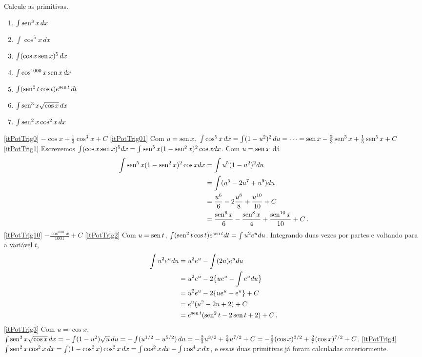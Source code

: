 \begin{exo} Calcule as primitivas.
\begin{multicols}{3}
\begin{enumerate}
\item\label{itPotTrig0} $\int \operatorname{sen}^3x\,dx$
\item\label{itPotTrig01} $\int \cos^5x\,dx$
\item\label{itPotTrig1} $\int (\cos x\operatorname{sen} x)^5\,dx$
\item\label{itPotTrig10} $\int \cos^{1000} x\operatorname{sen} x\,dx$
\item\label{itPotTrig2} $\int (\operatorname{sen}^2t\cos t) e^{\operatorname{sen} t}\,dt$
\item\label{itPotTrig3} $\int \operatorname{sen}^3x \sqrt{\cos x}\,dx$
\item\label{itPotTrig4} $\int \operatorname{sen}^2x\cos^2x\,dx$
\end{enumerate}
\end{multicols}
\vspace{0.01cm}
\begin{sol}
\eqref{itPotTrig0} $-\cos x+\tfrac13\cos^3x+C$
\eqref{itPotTrig01} Com $u=\operatorname{sen} x$, $\int \cos^5x\,dx=\int
(1-u^2)^2\,du=\cdots=\operatorname{sen} x-\tfrac23\operatorname{sen}^3x+\tfrac15\operatorname{sen}^5x+C$
\eqref{itPotTrig1} Escrevemos
$\int (\cos x\operatorname{sen} x)^5dx=\int
\operatorname{sen}^5x(1-\operatorname{sen}^2x)^2\cos xdx$. 
Com $u=\operatorname{sen} x$ dá 
\begin{align*}
 \int \operatorname{sen}^5x(1-\operatorname{sen}^2x)^2\cos xdx&=
\int u^5(1-u^2)^2du\\
&=\int (u^5-2u^7+u^9)du\\
&=\frac{u^6}{6}-2\frac{u^8}{8}+\frac{u^{10}}{10}+C\\
&=\frac{\operatorname{sen}^6x}{6}-\frac{\operatorname{sen}^8x}{4}+\frac{\operatorname{sen}^{10}x}{10}+C\,.
\end{align*}
\eqref{itPotTrig10} $-\frac{\cos^{1001}x}{1001}+C$
\eqref{itPotTrig2}
Com $u=\operatorname{sen} t$,
$\int (\operatorname{sen}^2t\cos t) e^{\operatorname{sen} t}dt=\int u^2e^udu$.
Integrando duas vezes por partes e voltando para a variável $t$,
\begin{align*}
 \int u^2e^udu&=u^2e^u-\int (2u)e^udu\\
&=u^2e^u-2\big\{ue^u-\int e^udu\big\}\\
&=u^2e^u-2\{ue^u-e^u\}+C\\
&=e^u(u^2-2u+2)+C\\
&=e^{\operatorname{sen} t}(\operatorname{sen}^2 t-2\operatorname{sen} t+2)+C\,.
\end{align*}
\eqref{itPotTrig3} Com $u=\cos x$, 
$\int \operatorname{sen}^3x \sqrt{\cos x}\,dx=-\int(1-u^2)\sqrt{u}\,du=-\int
(u^{1/2}-u^{5/2})\,du=-\tfrac23 u^{3/2}+\tfrac27 u^{7/2}+C=-\tfrac23
(\cos x)^{3/2}+\tfrac27 (\cos x)^{7/2}+C$.
\eqref{itPotTrig4} $\int
\operatorname{sen}^2x\cos^2x\,dx=\int(1-\cos^2x)\cos^2x\,dx=\int\cos^2x\,dx-\int\cos^4x\,dx$,
e essas duas primitivas já foram calculadas anteriormente. 
\end{sol}
\end{exo}


